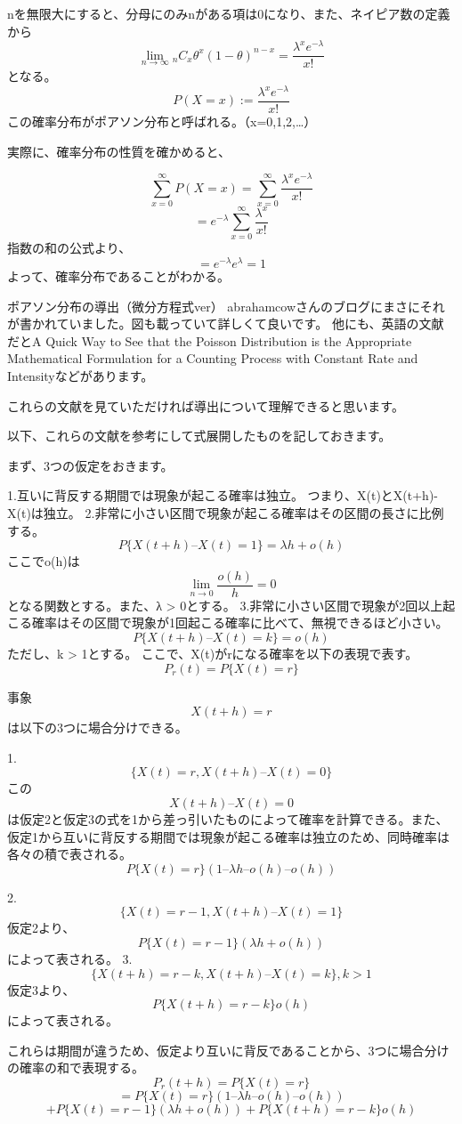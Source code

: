 \documentclass[]{article}
\begin{document}
nを無限大にすると、分母にのみnがある項は0になり、また、ネイピア数の定義から
\[ \lim_{n\to\infty}{}_{n} C_x \theta^x(1-\theta)^{n-x} = \frac{\lambda^x e^{-\lambda}}{x!}\]
となる。 \[P(X=x):= \frac{\lambda^x e^{-\lambda}}{x!}\]
この確率分布がポアソン分布と呼ばれる。（x=0,1,2,\ldots{}）

実際に、確率分布の性質を確かめると、

\[ \sum_{x=0}^{\infty} P(X=x) = \sum_{x=0}^{\infty} \frac{\lambda^x e^{-\lambda}}{x!} \]
\[ = e^{-\lambda} \sum_{x=0}^{\infty} \frac{\lambda^x}{x!} \]
指数の和の公式より、 \[ = e^{-\lambda} e^{\lambda} = 1 \]
よって、確率分布であることがわかる。

ポアソン分布の導出（微分方程式ver）
abrahamcowさんのブログにまさにそれが書かれていました。図も載っていて詳しくて良いです。
他にも、英語の文献だとA Quick Way to See that the Poisson Distribution
is the Appropriate Mathematical Formulation for a Counting Process with
Constant Rate and Intensityなどがあります。

これらの文献を見ていただければ導出について理解できると思います。

以下、これらの文献を参考にして式展開したものを記しておきます。

まず、3つの仮定をおきます。

1.互いに背反する期間では現象が起こる確率は独立。
つまり、X(t)とX(t+h)-X(t)は独立。
2.非常に小さい区間で現象が起こる確率はその区間の長さに比例する。
\[P\{X(t+h) – X(t) = 1 \} = \lambda h + o(h)\] ここでo(h)は
\[\lim_{n\to 0} \frac{o(h)}{h}=0\] となる関数とする。また、λ
\textgreater{} 0とする。
3.非常に小さい区間で現象が2回以上起こる確率はその区間で現象が1回起こる確率に比べて、無視できるほど小さい。
\[P\{X(t+h) – X(t) = k\} = o(h) \] ただし、k \textgreater{} 1とする。
ここで、X(t)がrになる確率を以下の表現で表す。
\[P_r (t) = P\{ X(t) = r \} \]

事象 \[X(t+h)=r\] は以下の3つに場合分けできる。

1.\[ \{ X(t) = r,X(t+h) – X(t) = 0 \}\] この \[X(t+h) – X(t) = 0\]
は仮定2と仮定3の式を1から差っ引いたものによって確率を計算できる。また、仮定1から互いに背反する期間では現象が起こる確率は独立のため、同時確率は各々の積で表される。
\[P\{ X(t) = r \} (1 – \lambda h – o(h) – o(h) )\]

2.\[ \{ X(t) = r-1,X(t+h) – X(t) = 1 \}\] 仮定2より、
\[P\{ X(t) = r-1 \} (\lambda h + o(h))\] によって表される。
3.\[ \{ X(t+h) = r-k,X(t+h) – X(t) = k \} , k > 1 \] 仮定3より、
\[P\{ X(t+h) = r-k \} o(h)\] によって表される。

これらは期間が違うため、仮定より互いに背反であることから、3つに場合分けの確率の和で表現する。
\[P_r(t+h) = P\{ X(t) = r \} \]
\[= P\{ X(t) = r \} (1 – \lambda h – o(h) – o(h) ) \]
\[+ P\{ X(t) = r-1 \} (\lambda h + o(h)) + P\{ X(t+h) = r-k \} o(h)\]
\end{document}
